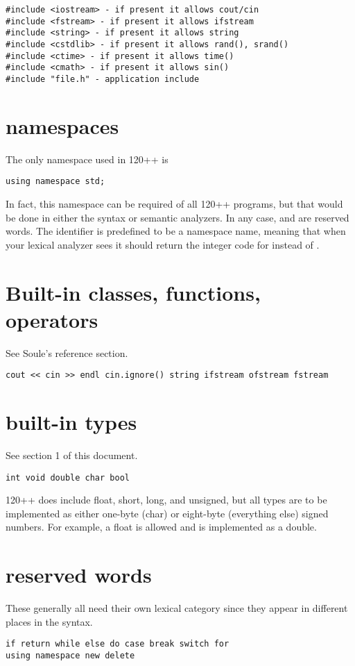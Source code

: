\begin{verbatim}
#include <iostream> - if present it allows cout/cin
#include <fstream> - if present it allows ifstream
#include <string> - if present it allows string
#include <cstdlib> - if present it allows rand(), srand()
#include <ctime> - if present it allows time()
#include <cmath> - if present it allows sin()
#include "file.h" - application include
\end{verbatim}

\section {namespaces}

The only namespace used in 120++ is

\begin{verbatim}
using namespace std;
\end{verbatim}

In fact, this namespace can be required of all 120++ programs, but
that would be done in either the syntax or semantic analyzers.  In any
case,  and  are reserved words.
The identifier  is predefined to be a namespace name,
meaning that when your lexical analyzer sees  it should
return the integer code for  instead of
.

\section {Built-in classes, functions, operators}

See Soule's reference section.


\begin{verbatim}
cout << cin >> endl cin.ignore() string ifstream ofstream fstream
\end{verbatim}

\section {built-in types}

See section 1 of this document.

\begin{verbatim}
int void double char bool
\end{verbatim}

120++ does include float, short, long, and unsigned, but all types are to
be implemented as either one-byte (char) or eight-byte (everything
else) signed numbers. For example, a float is allowed and is
implemented as a double.


\section {reserved words}

These generally all need their own lexical category since they appear
in different places in the syntax.

\begin{verbatim}
if return while else do case break switch for
using namespace new delete
\end{verbatim}
